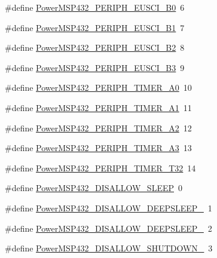 \begin{DoxyCompactItemize}
\item 
\#define \hyperlink{_power_m_s_p432_8h_af7f4a13a98c3fa6d836adaf3cfa14692}{Power\+M\+S\+P432\+\_\+\+P\+E\+R\+I\+P\+H\+\_\+\+E\+U\+S\+C\+I\+\_\+\+B0}~6
\item 
\#define \hyperlink{_power_m_s_p432_8h_ac08f09fe9332ed09f25d45cba7d5d5d8}{Power\+M\+S\+P432\+\_\+\+P\+E\+R\+I\+P\+H\+\_\+\+E\+U\+S\+C\+I\+\_\+\+B1}~7
\item 
\#define \hyperlink{_power_m_s_p432_8h_a93a7976210b1feb458cba7e11c9ac20e}{Power\+M\+S\+P432\+\_\+\+P\+E\+R\+I\+P\+H\+\_\+\+E\+U\+S\+C\+I\+\_\+\+B2}~8
\item 
\#define \hyperlink{_power_m_s_p432_8h_ae9ac91c6689ded7473c9a0e47570a0a0}{Power\+M\+S\+P432\+\_\+\+P\+E\+R\+I\+P\+H\+\_\+\+E\+U\+S\+C\+I\+\_\+\+B3}~9
\item 
\#define \hyperlink{_power_m_s_p432_8h_a2e6a14a07843453845167a111ba2d9f7}{Power\+M\+S\+P432\+\_\+\+P\+E\+R\+I\+P\+H\+\_\+\+T\+I\+M\+E\+R\+\_\+\+A0}~10
\item 
\#define \hyperlink{_power_m_s_p432_8h_aee1a68b262d54623bcae00976456e099}{Power\+M\+S\+P432\+\_\+\+P\+E\+R\+I\+P\+H\+\_\+\+T\+I\+M\+E\+R\+\_\+\+A1}~11
\item 
\#define \hyperlink{_power_m_s_p432_8h_a8a5d4f0981d05d037d90fa8550936613}{Power\+M\+S\+P432\+\_\+\+P\+E\+R\+I\+P\+H\+\_\+\+T\+I\+M\+E\+R\+\_\+\+A2}~12
\item 
\#define \hyperlink{_power_m_s_p432_8h_a68ba21c7e73f44e33b4d424e767b2c5f}{Power\+M\+S\+P432\+\_\+\+P\+E\+R\+I\+P\+H\+\_\+\+T\+I\+M\+E\+R\+\_\+\+A3}~13
\item 
\#define \hyperlink{_power_m_s_p432_8h_a61c4aff393736787f3d3f789011e3116}{Power\+M\+S\+P432\+\_\+\+P\+E\+R\+I\+P\+H\+\_\+\+T\+I\+M\+E\+R\+\_\+\+T32}~14
\item 
\#define \hyperlink{_power_m_s_p432_8h_a7d4d32c43f01483924215b268461dd58}{Power\+M\+S\+P432\+\_\+\+D\+I\+S\+A\+L\+L\+O\+W\+\_\+\+S\+L\+E\+E\+P}~0
\item 
\#define \hyperlink{_power_m_s_p432_8h_a104839515eff14d611a689f1290f65fb}{Power\+M\+S\+P432\+\_\+\+D\+I\+S\+A\+L\+L\+O\+W\+\_\+\+D\+E\+E\+P\+S\+L\+E\+E\+P\+\_}~1
\item 
\#define \hyperlink{_power_m_s_p432_8h_a9a86592233e713f250b9ecfa43b92513}{Power\+M\+S\+P432\+\_\+\+D\+I\+S\+A\+L\+L\+O\+W\+\_\+\+D\+E\+E\+P\+S\+L\+E\+E\+P\+\_}~2
\item 
\#define \hyperlink{_power_m_s_p432_8h_a74d643a11260f62a09a84dd414c258b5}{Power\+M\+S\+P432\+\_\+\+D\+I\+S\+A\+L\+L\+O\+W\+\_\+\+S\+H\+U\+T\+D\+O\+W\+N\+\_}~3

\end{DoxyCompactItemize}

